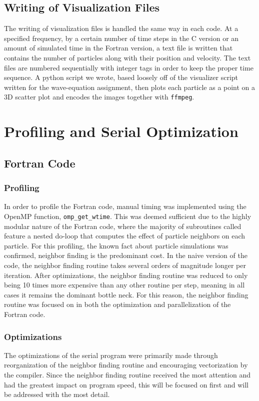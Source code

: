 \documentclass{scrartcl}
\begin{document}
    \subsection{Writing of Visualization Files}
    The writing of visualization files is handled the same way in each code. At a specified frequency, by a certain number of time steps in the C version or an amount of simulated time in the Fortran version, a text file is written that contains the number of particles along with their position and velocity. The text files are numbered sequentially with integer tags in order to keep the proper time sequence. A python script we wrote, based loosely off of the visualizer script written for the wave-equation assignment, then plots each particle as a point on a 3D scatter plot and encodes the images together with \texttt{ffmpeg}.

    \section{Profiling and Serial Optimization}
  
  \subsection{Fortran Code}
  \subsubsection{Profiling}
  In order to profile the Fortran code, manual timing was implemented using the OpenMP function, \texttt{omp\_get\_wtime}. This was deemed sufficient due to the highly modular nature of the Fortran code, where the majority of subroutines called feature a nested do-loop that computes the effect of particle neighbors on each particle. For this profiling, the known fact about particle simulations was confirmed, neighbor finding is the predominant cost. In the naive version of the code, the neighbor finding routine takes several orders of magnitude longer per iteration. After optimizations, the neighbor finding routine was reduced to only being 10 times more expensive than any other routine per step, meaning in all cases it remains the dominant bottle neck. For this reason, the neighbor finding routine was focused on in both the optimization and parallelization of the Fortran code. 
  
  \subsubsection{Optimizations}
  The optimizations of the serial program were primarily made through reorganization of the neighbor finding routine and encouraging vectorization by the compiler. Since the neighbor finding routine received the most attention and had the greatest impact on program speed,  this will be focused on first and will be addressed with the most detail.
  
\end{document}
